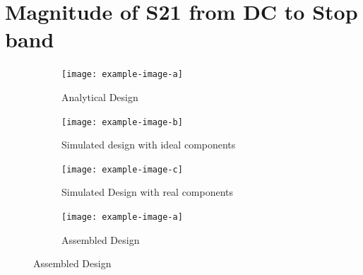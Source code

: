\documentclass[letterpaper,12pt]{article}
\begin{document}
\newpage
\section{Magnitude of S21 from DC to Stop band} \label{sec:s21_dcstop}
\begin{figure}[H]
    \begin{subfigure}[t]{.49\textwidth}
      \centering
      \texttt{[image: example-image-a]}
      \caption{Analytical Design}
    \end{subfigure}
    \hfill
    \begin{subfigure}[t]{.49\textwidth}
      \centering
      \texttt{[image: example-image-b]}
      \caption{Simulated design with ideal components}
    \end{subfigure}
  
    \medskip
  
    \begin{subfigure}[t]{.49\textwidth}
      \centering
      \texttt{[image: example-image-c]}
      \caption{Simulated Design with real components}
    \end{subfigure}
    \hfill
    \begin{subfigure}[t]{.49\textwidth}
      \centering
      \texttt{[image: example-image-a]}
      \caption{Assembled Design}
    \end{subfigure}
  \end{figure}

\newpage
\end{document}
